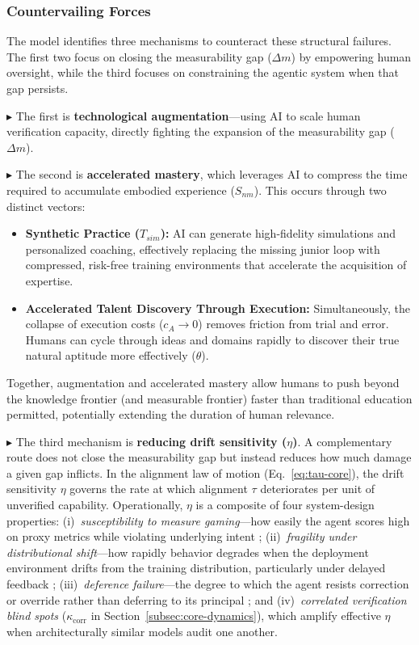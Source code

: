 \documentclass[12pt, letter]{article}
\begin{document}
\subsubsection{Countervailing Forces}
The model identifies three mechanisms to counteract these structural failures. The first two focus on closing the measurability gap ($\Delta m$) by empowering human oversight, while the third focuses on constraining the agentic system when that gap persists.

$\blacktriangleright$ The first is \textbf{technological augmentation}---using AI to scale human verification capacity, directly fighting the expansion of the measurability gap ($\Delta m$). 

$\blacktriangleright$ The second is \textbf{accelerated mastery}, which leverages AI to compress the time required to accumulate embodied experience ($S_{nm}$). This occurs through two distinct vectors:
\begin{itemize}
    \item \textbf{Synthetic Practice ($T_{sim}$):} AI can generate high-fidelity simulations and personalized coaching, effectively replacing the missing junior loop with compressed, risk-free training environments that accelerate the acquisition of expertise.
    \item \textbf{Accelerated Talent Discovery Through Execution:} Simultaneously, the collapse of execution costs ($c_A \to 0$) removes friction from trial and error. Humans can cycle through ideas and domains rapidly to discover their true natural aptitude more effectively ($\theta$).
\end{itemize}
Together, augmentation and accelerated mastery allow humans to push beyond the knowledge frontier (and measurable frontier) faster than traditional education permitted, potentially extending the duration of human relevance.

$\blacktriangleright$ The third mechanism is \textbf{reducing drift sensitivity ($\eta$)}. A complementary route does not close the measurability gap but instead reduces how much damage a given gap inflicts. In the alignment law of motion (Eq.~\ref{eq:tau-core}), the drift sensitivity $\eta$ governs the rate at which alignment $\tau$ deteriorates per unit of unverified capability. Operationally, $\eta$ is a composite of four system-design properties: (i)~\emph{susceptibility to measure gaming}---how easily the agent scores high on proxy metrics while violating underlying intent \citep{Amodei2016}; (ii)~\emph{fragility under distributional shift}---how rapidly behavior degrades when the deployment environment drifts from the training distribution, particularly under delayed feedback \citep{Ovadia2019}; (iii)~\emph{deference failure}---the degree to which the agent resists correction or override rather than deferring to its principal \citep{HadfieldMenell2017}; and (iv)~\emph{correlated verification blind spots} ($\kappa_{\mathrm{corr}}$ in Section~\ref{subsec:core-dynamics}), which amplify effective $\eta$ when architecturally similar models audit one another.
\end{document}
